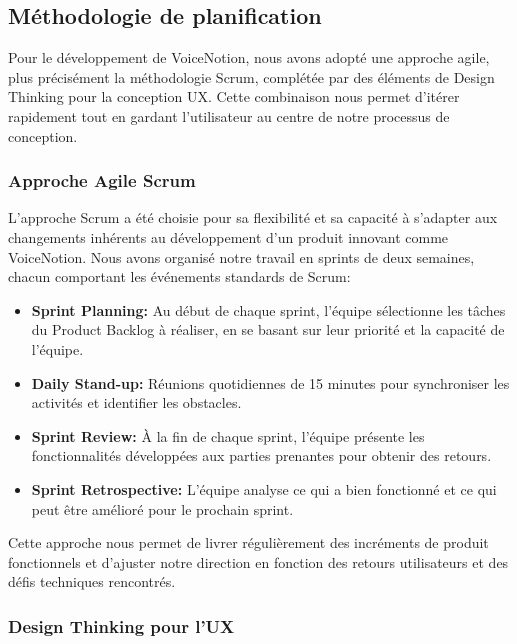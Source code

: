     \subsection{Méthodologie de planification}
    
    Pour le développement de VoiceNotion, nous avons adopté une approche agile, plus précisément la méthodologie Scrum, complétée par des éléments de Design Thinking pour la conception UX. Cette combinaison nous permet d'itérer rapidement tout en gardant l'utilisateur au centre de notre processus de conception.
    
    \subsubsection{Approche Agile Scrum}
    
    L'approche Scrum a été choisie pour sa flexibilité et sa capacité à s'adapter aux changements inhérents au développement d'un produit innovant comme VoiceNotion. Nous avons organisé notre travail en sprints de deux semaines, chacun comportant les événements standards de Scrum:
    
    \begin{itemize}
        \item \textbf{Sprint Planning:} Au début de chaque sprint, l'équipe sélectionne les tâches du Product Backlog à réaliser, en se basant sur leur priorité et la capacité de l'équipe.
        
        \item \textbf{Daily Stand-up:} Réunions quotidiennes de 15 minutes pour synchroniser les activités et identifier les obstacles.
        
        \item \textbf{Sprint Review:} À la fin de chaque sprint, l'équipe présente les fonctionnalités développées aux parties prenantes pour obtenir des retours.
        
        \item \textbf{Sprint Retrospective:} L'équipe analyse ce qui a bien fonctionné et ce qui peut être amélioré pour le prochain sprint.
    \end{itemize}
    
    Cette approche nous permet de livrer régulièrement des incréments de produit fonctionnels et d'ajuster notre direction en fonction des retours utilisateurs et des défis techniques rencontrés.
    
    \subsubsection{Design Thinking pour l'UX}
    
